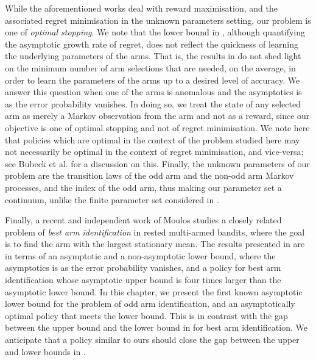 {While the aforementioned works deal with reward maximisation, and the associated regret minimisation in the unknown parameters setting, our problem is one of {\em optimal stopping}. We note that the lower bound in \cite{agrawal1989asymptotically}, although quantifying the asymptotic growth rate of regret, does not reflect the quickness of learning the underlying parameters of the arms. That is, the results in \cite{agrawal1989asymptotically} do not shed light on the minimum number of arm selections that are needed, on the average, in order to learn the parameters of the arms up to a desired level of accuracy. We answer this question when one of the arms is anomalous and the asymptotics is as the error probability vanishes. In doing so, we treat the state of any selected arm as merely a Markov observation from the arm and not as a reward, since our objective is one of optimal stopping and not of regret minimisation. We note here that policies which are optimal in the context of the problem studied here may not necessarily be optimal in the context of regret minimisation, and vice-versa; see Bubeck et al. \cite{Bubeck2011} for a discussion on this. Finally, the unknown parameters of our problem are the transition laws of the odd arm and the non-odd arm Markov processes, and the index of the odd arm, thus making our parameter set a continuum, unlike the finite parameter set considered in \cite{agrawal1989asymptotically}.}

Finally, a recent and independent work of Moulos \cite{moulos2019optimal} studies a closely related problem of \emph{best arm identification} in rested multi-armed bandits, where the goal is to find the arm with the largest stationary mean. The results presented in \cite{moulos2019optimal} are in terms of an asymptotic and a non-asymptotic lower bound, where the asymptotics is as the error probability vanishes, and a policy for best arm identification whose asymptotic upper bound is four times larger than the asymptotic lower bound. In this chapter, we present the first known asymptotic lower bound for the problem of odd arm identification, and an asymptotically optimal policy that meets the lower bound. This is in contrast with the gap between the upper bound and the lower bound in \cite{moulos2019optimal} for best arm identification. We anticipate that a policy similar to ours should close the gap between the upper and lower bounds in \cite{moulos2019optimal}.

